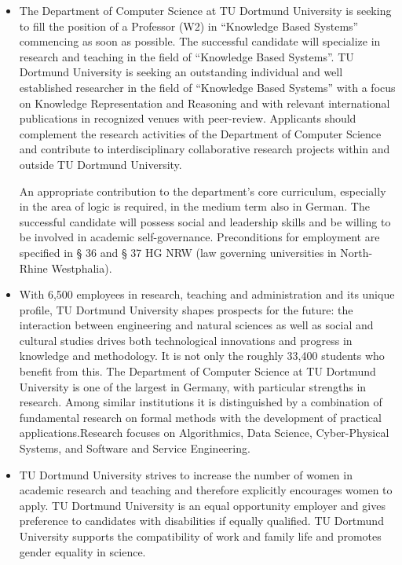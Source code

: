 \documentclass[prodmode,acmtecs]{acmsmall} %
\begin{document}
\begin{itemize}\item  The Department of Computer Science at TU Dortmund University is seeking to fill the position of a Professor (W2) in “Knowledge Based Systems” commencing as soon as possible. The successful candidate will specialize in research and teaching in the field of “Knowledge Based Systems”. TU Dortmund University is seeking an outstanding individual and well established researcher in the field of “Knowledge Based Systems” with a focus on Knowledge Representation and Reasoning and with relevant international publications in recognized venues with peer-review. Applicants should complement the research activities of the Department of Computer Science and contribute to interdisciplinary collaborative research projects within and outside TU Dortmund University. 
 
  An appropriate contribution to the department’s core curriculum, especially in the area of logic is required, in the medium term also in German. The successful candidate will possess social and leadership skills and be willing to be involved in academic self-governance. Preconditions for employment are specified in § 36 and § 37 HG NRW (law governing universities in North-Rhine Westphalia). 
 
\item  With 6,500 employees in research, teaching and administration and its unique profile, TU Dortmund University shapes prospects for the future: the interaction between engineering and natural sciences as well as social and cultural studies drives both technological innovations and progress in knowledge and methodology. It is not only the roughly 33,400 students who benefit from this. The Department of Computer Science at TU Dortmund University is one of the largest in Germany, with particular strengths in research. Among similar institutions it is distinguished by a combination of fundamental research on formal methods with the development of practical applications.Research focuses on Algorithmics, Data Science, Cyber-Physical Systems, and Software and Service Engineering. 
 
\item  TU Dortmund University strives to increase the number of women in academic research and teaching and therefore explicitly encourages women to apply. TU Dortmund University is an equal opportunity employer and gives preference to candidates with disabilities if equally qualified. TU Dortmund University supports the compatibility of work and family life and promotes gender equality in science. 
 

\end{itemize}
\end{document}
